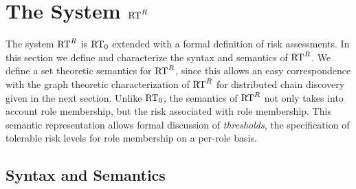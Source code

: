 \section{The System $\text{RT}^R$}
\label{section-rtr}

The system $\text{RT}^R$ is $\text{RT}_0$ extended with a formal definition of risk
assessments.  In this section we define and characterize the syntax
and semantics of $\text{RT}^R$.  We define a set theoretic semantics for
$\text{RT}^R$, since this allows an easy correspondence with the graph
theoretic characterization of $\text{RT}^R$ for distributed chain discovery
given in the next section.  Unlike $\text{RT}_0$, the semantics of $\text{RT}^R$ not
only takes into account role membership, but the risk associated with
role membership.  This semantic representation allows formal 
discussion of \emph{thresholds}, the specification of tolerable 
risk levels for role membership on a per-role basis.

\subsection{Syntax and Semantics}

